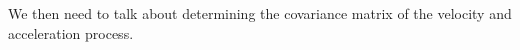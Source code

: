 \documentclass[twocol]{ametsoc}
\begin{document}
We then need to talk about determining the covariance matrix of the velocity and acceleration process.


%
%
%
%
%
%
%
%
%
%
%
\end{document}
